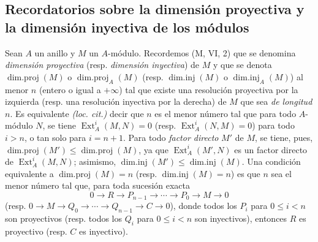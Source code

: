 \subsection{Recordatorios sobre la dimensión proyectiva y la dimensión inyectiva de los
módulos}
\label{subsection:0.17.2-es}

\begin{env}[17.2.1]
\label{0.17.2.1-es}
Sean $A$ un anillo y $M$ un $A$-módulo. Recordemos (M, VI, 2) que se denomina
\emph{dimensión proyectiva} (resp. \emph{dimensión inyectiva}) de $M$ y que
se denota $\operatorname{dim.proj}(M)$ o
$\operatorname{dim.proj}_A(M)$ (resp. $\operatorname{dim.inj}(M)$ o
$\operatorname{dim.inj}_A(M)$) al menor $n$ (entero o igual a $+\infty$)
tal que existe una resolución proyectiva por la izquierda (resp. una resolución
inyectiva por la derecha) de $M$ que sea \emph{de longitud $n$}. Es equivalente
\emph{(loc. cit.)} decir que $n$ es el menor número tal que para todo
$A$-módulo $N$, se tiene $\operatorname{Ext}^i_A(M,N)=0$ (resp.
$\operatorname{Ext}^i_A(N,M)=0$) para todo $i>n$, o tan solo para $i=n+1$.
Para todo \emph{factor directo} $M'$ de $M$, se tiene, pues,
$\operatorname{dim.proj}(M')\leq\operatorname{dim.proj}(M)$, ya que
$\operatorname{Ext}^i_A(M',N)$ es un factor directo de
$\operatorname{Ext}^i_A(M,N)$; asimismo,
$\operatorname{dim.inj}(M')\leq\operatorname{dim.inj}(M)$. Una condición
equivalente a $\operatorname{dim.proj}(M)=n$ (resp.
$\operatorname{dim.inj}(M)=n$) es que $n$ sea el menor número tal que,
para toda sucesión exacta
\[
  0\longrightarrow R\longrightarrow P_{n-1}\longrightarrow\cdots
  \longrightarrow P_0\longrightarrow M\longrightarrow0
\]
(resp.
$0\longrightarrow M\longrightarrow Q_0\longrightarrow\cdots
\longrightarrow Q_{n-1}\longrightarrow C\longrightarrow0$), donde todos los
$P_i$ para $0\leq i<n$ son proyectivos (resp. todos los $Q_i$ para $0\leq i<n$
son inyectivos), entonces $R$ es proyectivo (resp. $C$ es inyectivo).
\end{env}

